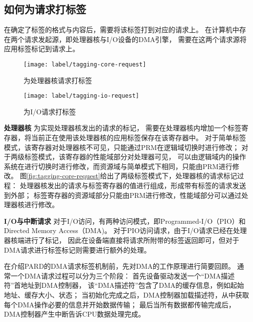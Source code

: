 \subsection{如何为请求打标签}
在确定了标签的格式与内容后，需要将该标签打到对应的请求上。
在计算机中存在两个请求发起源，即处理器核与I/O设备的DMA引擎，
需要在这两个请求源将应用标签标记到请求上。

\begin{figure}[b]
\begin{minipage}{0.48\textwidth}
  \centering
  \texttt{[image: label/tagging-core-request]}
  \caption{为处理器核请求打标签}
  \label{fig:tagging-core-request}
\end{minipage}\hfill
\begin{minipage}{0.48\textwidth}
  \centering
  \texttt{[image: label/tagging-io-request]}
  \caption{为I/O请求打标签}
  \label{fig:tagging-io-request}
\end{minipage}
\end{figure}

\textbf{处理器核}\quad
为实现处理器核发出的请求的标记，
需要在处理器核内增加一个标签寄存器，将当前正在使用该处理器核的应用标签保存在该寄存器中。
对于简单标签模式，该寄存器对处理器核不可见，只能通过PRM在逻辑域切换时进行修改；
对于两级标签模式，该寄存器的性能域部分对处理器可见，
可以由逻辑域内的操作系统在进行切换时进行修改，而资源域与简单模式下相同，只能由PRM进行修改。
图\ref{fig:tagging-core-request}给出了两级标签模式下，处理器核的请求标记过程：
处理器核发出的请求与标签寄存器的值进行组成，形成带有标签的请求发送到外部；
标签寄存器的资源域部分只能由PRM进行修改，性能域部分可以通过处理器核进行修改。

\textbf{I/O与中断请求}\quad
对于I/O访问，有两种访问模式，即Programmed-I/O（PIO）和Directed Memory Access（DMA)。
对于PIO访问请求，由于I/O请求已经在处理器核端进行了标记，
因此在设备端直接将请求所附带的标签返回即可，但对于DMA请求进行标签标记则需要进行额外的处理。

在介绍PARD的DMA请求标签机制前，先对DMA的工作原理进行简要回顾。
通常一个DMA请求过程可以分为三个阶段：
首先设备驱动发送一个“DMA描述符”首地址到DMA控制器，
该“DMA描述符”包含了DMA的缓存信息，例如起始地址、缓存大小、状态；
当初始化完成之后，DMA控制器加载描述符，从中获取每个DMA操作必要的信息并开始数据传输；
最后当所有数据都传输完成后，DMA控制器产生中断告诉CPU数据处理完成。

